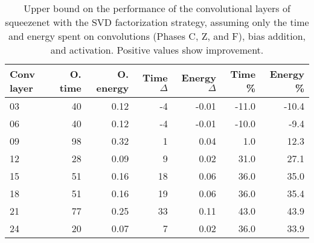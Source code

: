 \begin{table}
\centering
\begin{tabular}{|l|r|r|r|r|r|r|}
\hline
Conv layer & O. time & O. energy & Time $\Delta$ & Energy $\Delta$ & Time \% & Energy \% \\\hline
03 & 40 & 0.12 & -4 & -0.01 & -11.0 & -10.4 \\\hline
06 & 40 & 0.12 & -4 & -0.01 & -10.0 & -9.4 \\\hline
09 & 98 & 0.32 & 1 & 0.04 & 1.0 & 12.3 \\\hline
12 & 28 & 0.09 & 9 & 0.02 & 31.0 & 27.1 \\\hline
15 & 51 & 0.16 & 18 & 0.06 & 36.0 & 35.0 \\\hline
18 & 51 & 0.16 & 19 & 0.06 & 36.0 & 35.4 \\\hline
21 & 77 & 0.25 & 33 & 0.11 & 43.0 & 43.9 \\\hline
24 & 20 & 0.07 & 7 & 0.02 & 36.0 & 33.9 \\\hline
\end{tabular}
\caption{Upper bound on the performance of the convolutional layers of squeezenet with the SVD factorization strategy, assuming only the time and energy spent on convolutions (Phases C, Z, and F), bias addition, and activation. Positive values show improvement.}
\label{squeezenet-max-performance}
\end{table}
